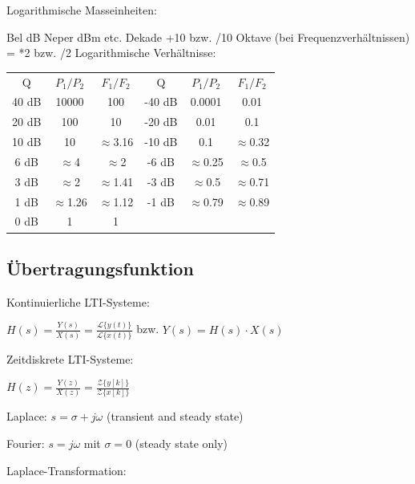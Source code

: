 \begin{sectionbox}

Logarithmische Masseinheiten:

	Bel
	dB
	Neper
	dBm etc.
Dekade +10 bzw. /10 
Oktave (bei Frequenzverhältnissen) = *2 bzw. /2
	Logarithmische Verhältnisse:

	\begin{tabular}{c|c|c|c|c|c}
		Q & $ P_1/P_2 $ & $ F_1/F_2 $ & Q & $ P_1/P_2 $ & $ F_1/F_2 $\\
		40 dB & 10000 & 100 & -40 dB & 0.0001 & 0.01 \\
		20 dB & 100 & 10 & -20 dB& 0.01 & 0.1 \\
		10 dB & 10 & $\approx$3.16 & -10 dB& 0.1 & $\approx$0.32 \\
		6 dB & $\approx$4 & $\approx$2 & -6 dB &$\approx$0.25 & $\approx$0.5\\
		3 dB & $\approx$2 & $\approx$1.41 & -3 dB & $\approx$0.5&$\approx$0.71 \\
		1 dB & $\approx$1.26 & $\approx$1.12 & -1 dB & $\approx$0.79&$\approx$0.89\\
		0 dB & 1 & 1 & & & \\
	\end{tabular}

\end{sectionbox}

\subsection{Übertragungsfunktion}

\begin{sectionbox}
Kontinuierliche LTI-Systeme:
	\begin{emphbox}
		$ H(s) = \frac{Y(s)}{X(s)} = \frac{\mathcal{L}\{y(t)\}}{\mathcal{L}\{x(t)\}} $ bzw. $ Y(s) = H(s) \cdot X(s) $
	\end{emphbox}
\end{sectionbox}
\begin{sectionbox}
	Zeitdiskrete LTI-Systeme:
	\begin{emphbox}
		$ H(z) = \frac{Y(z)}{X(z)} = \frac{\mathcal{Z}\{y[k]\}}{\mathcal{Z}\{x[k]\}} $
	\end{emphbox}
\end{sectionbox}


Laplace: $ s = \sigma + j \omega $ (transient and steady state)

Fourier: $ s = j \omega $ mit $\sigma = 0$ (steady state only)


Laplace-Transformation:

